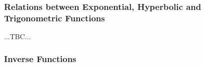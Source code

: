 














\subsubsection{Relations between Exponential, Hyperbolic and Trigonometric Functions}

...TBC...



\subsubsection{Inverse Functions}

